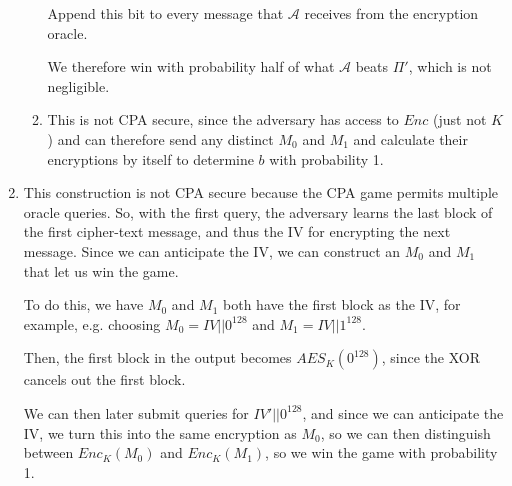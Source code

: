 \begin{enumerate}[label=(\alph*)]
\begin{enumerate}[label=(\roman*)]
        Append this bit to every message that $\mathcal{A}$ receives from the encryption oracle.

        We therefore win with probability half of what $\mathcal{A}$ beats $\Pi'$, which is not negligible.

      \item
        This is not CPA secure, since the adversary has access to $Enc$ (just not $K$) and can therefore send any distinct $M_0$ and $M_1$ and calculate their encryptions by itself to determine $b$ with probability 1.

        
    \end{enumerate}

  \item
    This construction is not CPA secure because the CPA game permits multiple oracle queries. So, with the first query, the adversary learns the last block of the first cipher-text message, and thus the IV for encrypting the next message. Since we can anticipate the IV, we can construct an $M_0$ and $M_1$ that let us win the game.

    To do this, we have $M_0$ and $M_1$ both have the first block as the IV, for example, e.g. choosing $M_0 = IV||0^128$ and $M_1 = IV||1^128$.

    Then, the first block in the output becomes $AES_K(0^128)$, since the XOR cancels out the first block.

    We can then later submit queries for $IV'||0^128$, and since we can anticipate the IV, we turn this into the same encryption as $M_0$, so we can then distinguish between $Enc_K(M_0)$ and $Enc_K(M_1)$, so we win the game with probability 1.

        
\end{enumerate}

